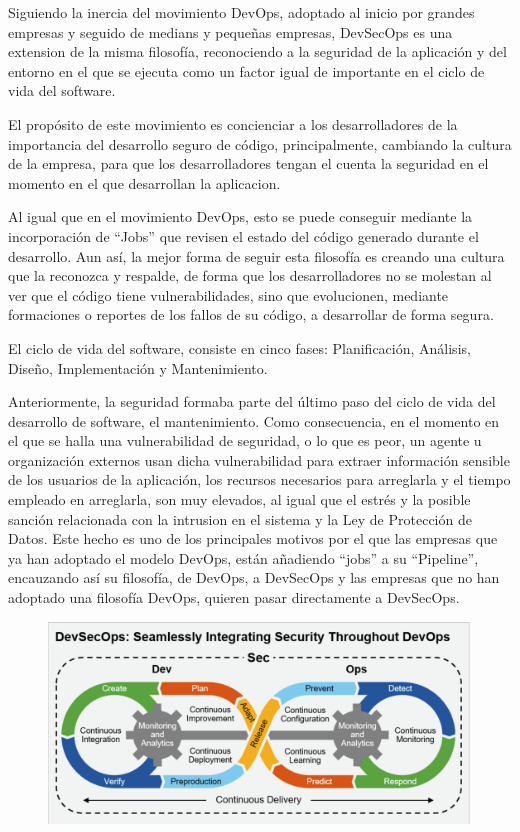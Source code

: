 \documentclass[12pt]{report} %
\begin{document}
Siguiendo la inercia del movimiento DevOps, adoptado al inicio por grandes
empresas y seguido de medians y pequeñas empresas, DevSecOps es una extension de
la misma filosofía, reconociendo a la seguridad de la aplicación y del entorno
en el que se ejecuta como un factor igual de importante en el ciclo de vida del
software.

El propósito de este movimiento es concienciar a los desarrolladores de la
importancia del desarrollo seguro de código, principalmente, cambiando la
cultura de la empresa, para que los desarrolladores tengan el cuenta la
seguridad en el momento en el que desarrollan la aplicacion.

Al igual que en el movimiento DevOps, esto se puede conseguir mediante la
incorporación de ``Jobs'' que revisen el estado del código generado durante el
desarrollo.  Aun así, la mejor forma de seguir esta filosofía es creando una
cultura que la reconozca y respalde, de forma que los desarrolladores no se
molestan al ver que el código tiene vulnerabilidades, sino que evolucionen,
mediante formaciones o reportes de los fallos de su código, a desarrollar de
forma segura.

El ciclo de vida del software, consiste en cinco fases: Planificación, Análisis,
Diseño, Implementación y Mantenimiento.


Anteriormente, la seguridad formaba parte del último paso del ciclo de vida del
desarrollo de software, el mantenimiento.  Como consecuencia, en el momento en
el que se halla una vulnerabilidad de seguridad, o lo que es peor, un agente u
organización externos usan dicha vulnerabilidad para extraer información
sensible de los usuarios de la aplicación, los recursos necesarios para
arreglarla y el tiempo empleado en arreglarla, son muy elevados, al igual que el
estrés y la posible sanción relacionada con la intrusion en el sistema y la Ley
de Protección de Datos.  Este hecho es uno de los principales motivos por el que
las empresas que ya han adoptado el modelo DevOps, están añadiendo ``jobs'' a su
``Pipeline'', encauzando así su filosofía, de DevOps, a DevSecOps y las empresas
que no han adoptado una filosofía DevOps, quieren pasar directamente a
DevSecOps.

\begin{figure} 
  \includegraphics[width=\textwidth]{devsecops.png} 
\end{figure}
\end{document}
